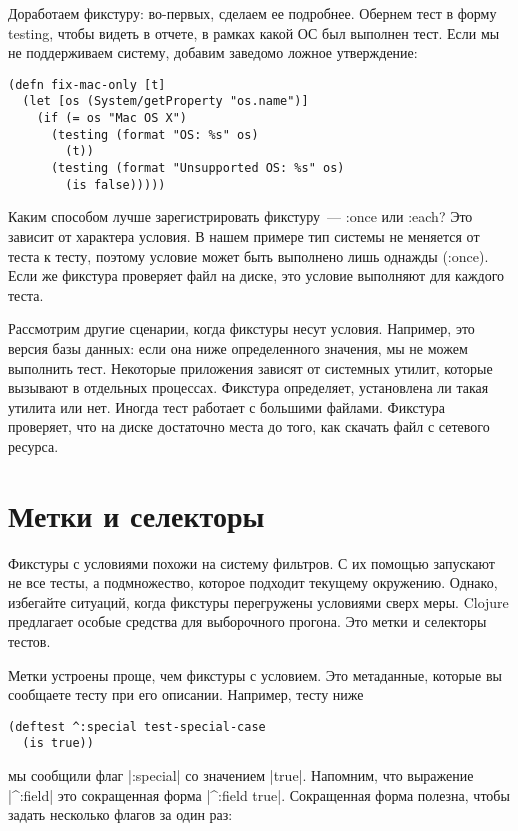 Доработаем фикстуру: во-первых, сделаем ее подробнее. Обернем тест в форму
testing, чтобы видеть в отчете, в рамках какой ОС был выполнен тест. Если мы не
поддерживаем систему, добавим заведомо ложное утверждение:

\begin{verbatim}
(defn fix-mac-only [t]
  (let [os (System/getProperty "os.name")]
    (if (= os "Mac OS X")
      (testing (format "OS: %s" os)
        (t))
      (testing (format "Unsupported OS: %s" os)
        (is false)))))
\end{verbatim}

Каким способом лучше зарегистрировать фикстуру~--- :once или :each? Это зависит от
характера условия. В нашем примере тип системы не меняется от теста к тесту,
поэтому условие может быть выполнено лишь однажды (:once). Если же фикстура
проверяет файл на диске, это условие выполняют для каждого теста.

Рассмотрим другие сценарии, когда фикстуры несут условия. Например, это версия
базы данных: если она ниже определенного значения, мы не можем выполнить
тест. Некоторые приложения зависят от системных утилит, которые вызывают в
отдельных процессах. Фикстура определяет, установлена ли такая утилита или
нет. Иногда тест работает с большими файлами. Фикстура проверяет, что на диске
достаточно места до того, как скачать файл с сетевого ресурса.

\section{Метки и селекторы}

Фикстуры с условиями похожи на систему фильтров. С их помощью запускают не все
тесты, а подмножество, которое подходит текущему окружению. Однако, избегайте
ситуаций, когда фикстуры перегружены условиями сверх меры. Clojure предлагает
особые средства для выборочного прогона. Это метки и селекторы тестов.

Метки устроены проще, чем фикстуры с условием. Это метаданные, которые вы
сообщаете тесту при его описании. Например, тесту ниже

\begin{verbatim}
(deftest ^:special test-special-case
  (is true))
\end{verbatim}

мы сообщили флаг \spverb|:special| со значением \spverb|true|. Напомним, что
выражение \spverb|^:field| это сокращенная форма \spverb|^{:field true}|.
Сокращенная форма полезна, чтобы задать несколько флагов за один раз:

